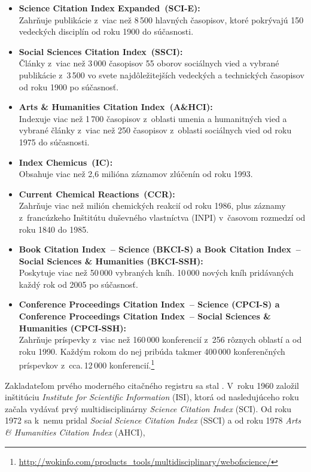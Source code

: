 \begin{itemize}
\item \textbf{Science Citation Index Expanded\R\ (SCI-E):}\\
  Zahrňuje publikácie z~viac než 8\,500 hlavných časopisov, ktoré pokrývajú 150
  vedeckých disciplín od roku 1900 do súčasnosti.
\item \textbf{Social Sciences Citation Index\R\ (SSCI):}\\
  Články z~viac než 3\,000 časopisov 55 oborov sociálnych vied a vybrané
  publikácie z~3\,500 vo svete najdôležitejších vedeckých a technických
  časopisov od roku 1900 po súčasnosť.
\item \textbf{Arts \& Humanities Citation Index\R\ (A\&HCI):}\\
  Indexuje viac než 1\,700 časopisov z~oblasti umenia a humanitných vied a
  vybrané články z~viac než 250 časopisov z~oblasti sociálnych vied od roku 1975
  do súčasnosti.
\item \textbf{Index Chemicus\R\ (IC):}\\
  Obsahuje viac než 2,6 milióna záznamov zlúčenín od roku 1993.
\item \textbf{Current Chemical Reactions\R\ (CCR):}\\
  Zahrňuje viac než milión chemických reakcií od roku 1986, plus záznamy
  z~francúzkeho Inštitútu duševného vlastníctva (INPI) v~časovom rozmedzí od
  roku 1840 do 1985.
\item \textbf{Book Citation Index\R\ -- Science (BKCI-S) a Book Citation
    Index\R\ -- Social Sciences \& Humanities (BKCI-SSH):}\\
  Poskytuje viac než 50\,000 vybraných kníh.  10\,000 nových kníh pridávaných
  každý rok od 2005 po súčasnosť.
\item \textbf{Conference Proceedings Citation Index\R\ -- Science (CPCI-S) a
    Conference Proceedings Citation Index\R\ -- Social Sciences \& Humanities
    (CPCI-SSH):}\\
  Zahrňuje príspevky z~viac než 160\,000 konferencií z~256 rôznych oblastí
   a 
  od roku 1990.  Každým rokom do nej pribúda takmer 400\,000 konferenčných
  príspevkov z~cca.\,12\,000
  konferencií.\footnote{\url{http://wokinfo.com/products_tools/multidisciplinary/webofscience/}}
\end{itemize}

Zakladateľom prvého moderného citačného registru sa stal \citet{Garfield1955}.
V~roku 1960 založil inštitúciu \emph{Institute for Scientific Information}
(ISI), ktorá od nasledujúceho roku začala vydávať prvý multidisciplinárny
 \emph{Science Citation Index} (SCI).  Od
roku 1972 sa k~nemu pridal  \emph{Social
  Science Citation Index} (SSCI) a od roku 1978  \emph{Arts \& Humanities Citation Index} (AHCI), \citep{Smith2012}


